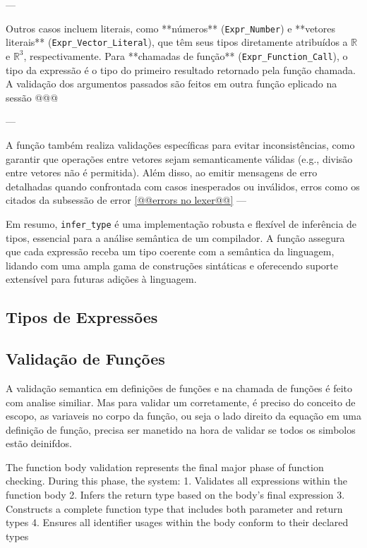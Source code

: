 ---

Outros casos incluem literais, como **números** (\verb`Expr_Number`) e **vetores literais** (\verb`Expr_Vector_Literal`), que têm seus tipos diretamente atribuídos a $\mathbb{R}$ e $\mathbb{R}^3$, respectivamente. Para **chamadas de função** (\verb`Expr_Function_Call`), o tipo da expressão é o tipo do primeiro resultado retornado pela função chamada. A validação dos argumentos passados são feitos em outra função eplicado na sessão @@@

---

A função também realiza validações específicas para evitar inconsistências, como garantir que operações entre vetores sejam semanticamente válidas (e.g., divisão entre vetores não é permitida). Além disso, ao emitir mensagens de erro detalhadas quando confrontada com casos inesperados ou inválidos, erros como os citados da subsessão de error \autoref{@@errors no lexer@@}
---

Em resumo, \verb`infer_type` é uma implementação robusta e flexível de inferência de tipos, essencial para a análise semântica de um compilador. A função assegura que cada expressão receba um tipo coerente com a semântica da linguagem, lidando com uma ampla gama de construções sintáticas e oferecendo suporte extensível para futuras adições à linguagem.


\subsection{Tipos de Expressões}

\subsection{Validação de Funções}
A validação semantica em definições de funções e na chamada de funções é feito com analise similiar. Mas para validar um corretamente, é preciso do conceito de escopo, as variaveis no corpo da função, ou seja o lado direito da equação em uma definição de função, precisa ser manetido na hora de validar se todos os simbolos estão deinifdos.

The function body validation represents the final major phase of function checking. During this phase, the system:
1. Validates all expressions within the function body
2. Infers the return type based on the body's final expression
3. Constructs a complete function type that includes both parameter and return types
4. Ensures all identifier usages within the body conform to their declared types

